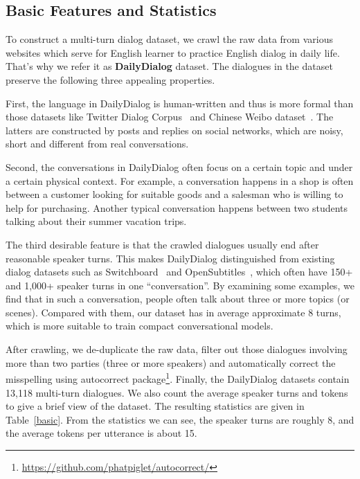 \documentclass[11pt,letterpaper]{article}
\begin{document}
\subsection{Basic Features and Statistics}
To construct a multi-turn dialog dataset, we crawl the raw data from various websites which serve for English learner to practice English dialog in daily life. That's why we refer it as \textbf{DailyDialog} dataset. The dialogues in the dataset preserve the following three appealing properties. 

First, the language in DailyDialog is human-written and thus is more formal than those datasets like Twitter Dialog Corpus~\cite{twitter} and Chinese Weibo dataset~\cite{weibo}. The latters are constructed by posts and replies on social networks, which are noisy, short and different from real conversations.

Second, the conversations in DailyDialog often focus on a certain topic and under a certain physical context. For example, a conversation happens in a shop is often between a customer looking for suitable goods and a salesman who is willing to help for purchasing. Another typical conversation happens between two students talking about their summer vacation trips. %

The third desirable feature is that the crawled dialogues usually end after reasonable speaker turns. This makes DailyDialog distinguished from existing dialog datasets such as Switchboard~\cite{switchboard} and OpenSubtitles~\cite{opensubtitles}, which often have 150+ and 1,000+ speaker turns in one ``conversation''. By examining some examples, we find that in such a conversation, people often talk about three or more topics (or scenes). Compared with them, our dataset has in average approximate 8 turns, which is more suitable to train compact conversational models.

After crawling, we de-duplicate the raw data, filter out those dialogues involving more than two parties (three or more speakers) and automatically correct the misspelling using autocorrect package\footnote{\url{https://github.com/phatpiglet/autocorrect/}}. Finally, the DailyDialog datasets contain 13,118 multi-turn dialogues. We also count the average speaker turns and tokens to give a brief view of the dataset. The resulting statistics are given in Table~\ref{basic}. From the statistics we can see, the speaker turns are roughly 8, and the average tokens per utterance is about 15. 
\end{document}
